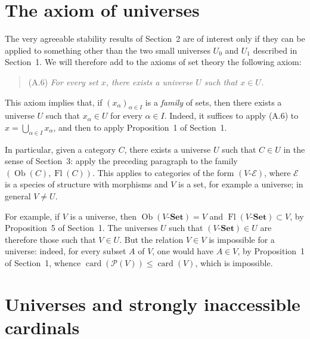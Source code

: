 \documentclass[11pt]{article}
\newcommand{\Set}{\mathbf{Set}}
\newcommand{\Ob}{\operatorname{Ob}}
\newcommand{\Fl}{\operatorname{Fl}}
\newcommand{\card}{\operatorname{card}}
\newcommand{\Pset}{\mathcal{P}}
\begin{document}
\section{The axiom of universes}

The very agreeable stability results of Section~2 are of interest only if they can be applied to something other than the two small universes \(U_0\) and \(U_1\) described in Section~1. We will therefore add to the axioms of set theory the following axiom:
\begin{quote}
(A.6) \emph{For every set \(x\), there exists a universe \(U\) such that \(x\in U\).}
\end{quote}

This axiom implies that, if \((x_\alpha)_{\alpha\in I}\) is a \emph{family} of sets, then there exists a universe \(U\) such that \(x_\alpha\in U\) for every \(\alpha\in I\). Indeed, it suffices to apply (A.6) to \(x=\bigcup_{\alpha\in I}x_\alpha\), and then to apply Proposition~1 of Section~1.

In particular, given a category \(C\), there exists a universe \(U\) such that \(C\in U\) in the sense of Section~3: apply the preceding paragraph to the family \((\Ob(C),\Fl(C))\). This applies to categories of the form \((V\text{-}\mathcal E)\), where \(\mathcal E\) is a species of structure with morphisms and \(V\) is a set, for example a universe; in general \(V\neq U\).

For example, if \(V\) is a universe, then \(\Ob(V\text{-}\Set)=V\) and \(\Fl(V\text{-}\Set)\subset V\), by Proposition~5 of Section~1. The universes \(U\) such that \((V\text{-}\Set)\in U\) are therefore those such that \(V\in U\). But the relation \(V\in V\) is impossible for a universe: indeed, for every subset \(A\) of \(V\), one would have \(A\in V\), by Proposition~1 of Section~1, whence \(\card(\Pset(V))\leq\card(V)\), which is impossible.

\section{Universes and strongly inaccessible cardinals}
\end{document}
